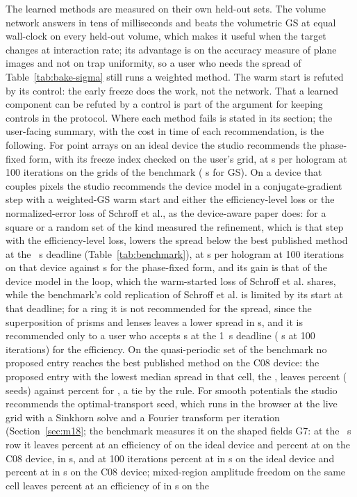 The learned methods are measured on their own held-out sets. The volume network answers in tens of milliseconds and beats the volumetric GS at equal wall-clock on every held-out volume, which makes it useful when the target changes at interaction rate; its advantage is on the accuracy measure of plane images and not on trap uniformity, so a user who needs the spread of Table~\ref{tab:bake-sigma} still runs a weighted method. The warm start is refuted by its control: the early freeze does the work, not the network. That a learned component can be refuted by a control is part of the argument for keeping controls in the protocol. Where each method fails is stated in its section; the user-facing summary, with the cost in time of each recommendation, is the following. For point arrays on an ideal device the studio recommends the phase-fixed form, with its freeze index checked on the user's grid, at \benchSecIdealPF{} s per hologram at 100 iterations on the grids of the benchmark (\benchSecIdealGS{} s for GS). On a device that couples pixels the studio recommends the device model in a conjugate-gradient step with a weighted-GS warm start and either the efficiency-level loss or the normalized-error loss of Schroff et al., as the device-aware paper does: for a square or a random set of the kind measured the refinement, which is that step with the efficiency-level loss, lowers the spread below the best published method at the \dlReadS{}~s deadline (Table~\ref{tab:benchmark}), at \benchSecDeviceBOne{} s per hologram at 100 iterations on that device against \benchSecDevicePF{} s for the phase-fixed form, and its gain is that of the device model in the loop, which the warm-started loss of Schroff et al. shares, while the benchmark's cold replication of Schroff et al. is limited by its start at that deadline; for a ring it is not recommended for the spread, since the superposition of prisms and lenses leaves a lower spread in \ringTimePubSec{} s, and it is recommended only to a user who accepts \ringTimeBOneSec{} s at the 1~s deadline (\ringIterBOneSec{} s at 100 iterations) for the efficiency. On the quasi-periodic set of the benchmark no proposed entry reaches the best published method on the C08 device: the proposed entry with the lowest median spread in that cell, the \gFourProposedName{}, leaves \gFourBOneSigma{} percent (\gFourBOneSeeds{} seeds) against \gFourPubSigma{} percent for \gFourPubMethod{}, a tie by the rule. For smooth potentials the studio recommends the optimal-transport seed, which runs in the browser at the live grid with a Sinkhorn solve and a Fourier transform per iteration (Section~\ref{sec:m18}; the benchmark measures it on the shaped fields G7: at the \dlReadS{}~s row it leaves \gsOtIdealOneSig{} percent at an efficiency of \gsOtIdealOneEff{} on the ideal device and \gsOtDeviceOneSig{} percent at \gsOtDeviceOneEff{} on the C08 device, in \gsOtIdealOneSec{} s, and at 100 iterations \gsOtIdealHundredSig{} percent at \gsOtIdealHundredEff{} in \gsOtIdealHundredSec{} s on the ideal device and \gsOtDeviceHundredSig{} percent at \gsOtDeviceHundredEff{} in \gsOtDeviceHundredSec{} s on the C08 device; mixed-region amplitude freedom on the same cell leaves \gsMrafIdealHundredSig{} percent at an efficiency of \gsMrafIdealHundredEff{} in \gsMrafIdealHundredSec{} s on the 